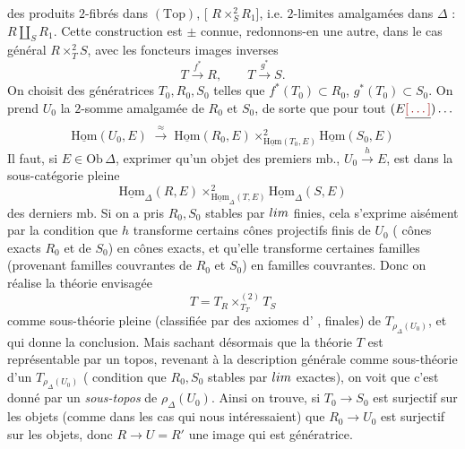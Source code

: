 \documentclass[11pt,a4paper]{article}
\begin{document}
des produits $2$-fibrés dans $(\mathrm{Top})$, [ $R \times^{2}_{S} R_{1}$],
i.e. $2$-limites amalgamées dans $\Delta$ : $R \amalg_{S} R_{1}$. Cette construction
est $\pm$ connue, redonnons-en une autre, dans le cas général $R \times^{2}_{T} S$,
avec les foncteurs images inverses
\[
  T \xrightarrow{\ f^{*}\ } R, \qquad T \xrightarrow{\ g^{*}\ } S .
\]
On choisit des   génératrices
$T_{0}, R_{0}, S_{0}$ telles que $f^{*}(T_{0}) \subset R_{0}$,
$g^{*}(T_{0}) \subset S_{0}$. On prend $U_{0}$ la  $2$-somme
amalgamée de $R_{0}$ et $S_{0}$, de sorte que pour tout $(E \struck{\ill{}}) \ldots$
\[
  \underline{\mathrm{Hom}}(U_{0}, E)
  \;\xrightarrow{\ \approx\ }\;
  \underline{\mathrm{Hom}}(R_{0}, E)
    \times^{2}_{\underline{\mathrm{Hom}}(T_{0},E)}
  \underline{\mathrm{Hom}}(S_{0}, E)
\]
Il faut, si $E \in \mathrm{Ob}\,\Delta$, exprimer qu'un objet des  premiers mb., $U_{0} \xrightarrow{h} E$, est dans \struck{\ill{}} la
sous-catégorie pleine
\[
  \underline{\mathrm{Hom}}_{\Delta}(R, E)
    \times^{2}_{\underline{\mathrm{Hom}}_{\Delta}(T,E)}
  \underline{\mathrm{Hom}}_{\Delta}(S, E)
\]
des derniers mb. Si on a pris $R_{0}, S_{0}$ stables par $\varprojlim$ finies,
cela s'exprime aisément par la  
condition que $h$ transforme certains cônes projectifs finis de $U_{0}$
(  cônes exacts  $R_{0}$ et de $S_{0}$)
en cônes exacts, et  qu'elle transforme certaines familles
(provenant \ill{} familles couvrantes de $R_{0}$ et $S_{0}$) en familles
couvrantes. Donc on réalise la théorie envisagée
\[
  T = T_{R} \times^{(2)}_{T_{T}} T_{S}
\]
comme sous-théorie pleine (classifiée par des axiomes d'\struck{\ill{}}
\ill{}, finales) de $T_{\rho_{\Delta}(U_{0})}$, et qui donne la conclusion.
Mais sachant désormais que  la théorie $T$ est représentable par
un topos,  revenant à la description générale comme sous-théorie
d'un $T_{\rho_{\Delta}(U_{0})}$ (  condition que
$R_{0}, S_{0}$ stables par $\varprojlim$ exactes), on voit que c'est donné par
un \emph{sous-topos} de $\rho_{\Delta}(U_{0})$. Ainsi on trouve, si
$T_{0} \to S_{0}$ est surjectif sur les objets (comme dans les cas qui nous
intéressaient) que $R_{0} \to U_{0}$ est surjectif sur les objets, donc
$R \to U = R'$   \ill{} une image qui est génératrice.
\end{document}
